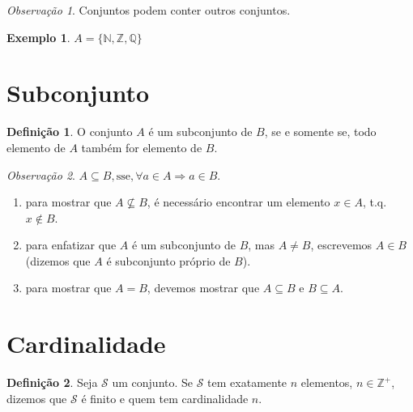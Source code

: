 \documentclass[]{book}
\theoremstyle{definition}
\newtheorem{definition}{Definição}[chapter]
\theoremstyle{definition}
\newtheorem{example}{Exemplo}[chapter]
\theoremstyle{definition}
\theoremstyle{remark}
\newtheorem*{remark}{Observação}
\begin{document}
\begin{remark}
\iffalse{} {Observação. } \fi{}Conjuntos podem conter outros conjuntos.
\end{remark}

\begin{example}
\protect\hypertarget{exm:unnamed-chunk-6}{}{\label{exm:unnamed-chunk-6} }\(A = \{\mathbb{N}, \mathbb{Z}, \mathbb{Q}\}\)
\end{example}

\hypertarget{subconjunto}{%
\section{Subconjunto}\label{subconjunto}}

\begin{definition}
\protect\hypertarget{def:defSubConj}{}{\label{def:defSubConj} }O conjunto \(A\) é um subconjunto de \(B\), se e somente se, todo elemento de \(A\) também for elemento de \(B\).
\end{definition}
\begin{remark}
\iffalse{} {Observação. } \fi{}\(A \subseteq B, \text{sse}, \forall a \in A \Rightarrow a \in B\).

\begin{enumerate}
\def\labelenumi{\arabic{enumi}.}
\item
  para mostrar que \(A \nsubseteq B\), é necessário encontrar um elemento \(x \in A\), t.q. \(x \notin B\).
\item
  para enfatizar que \(A\) é um subconjunto de \(B\), mas \(A \ne B\), escrevemos \(A \in B\) (dizemos que \(A\) é subconjunto próprio de \(B\)).
\item
  para mostrar que \(A = B\), devemos mostrar que \(A \subseteq B\) e \(B \subseteq A\).
\end{enumerate}
\end{remark}

\hypertarget{cardinalidade}{%
\section{Cardinalidade}\label{cardinalidade}}

\begin{definition}
\protect\hypertarget{def:defcardin}{}{\label{def:defcardin} }Seja \(\mathcal{S}\) um conjunto. Se \(\mathcal{S}\) tem exatamente \(n\) elementos, \(n \in \mathbb{Z}^{+}\), dizemos que \(\mathcal{S}\) é finito e quem tem cardinalidade \(n\).
\end{definition}
\end{document}
